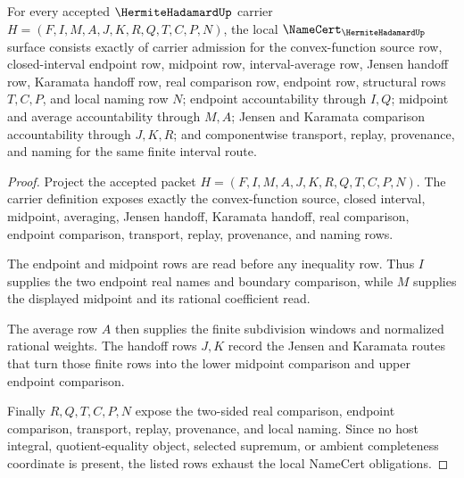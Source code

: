 \begin{theorem}
\label{thm:hermite-hadamard-namecert-obligations}
For every accepted $\HermiteHadamardUp$ carrier $H=(F,I,M,A,J,K,R,Q,T,C,P,N)$, the local $\NameCert_{\HermiteHadamardUp}$ surface consists exactly of carrier admission for the convex-function source row, closed-interval endpoint row, midpoint row, interval-average row, Jensen handoff row, Karamata handoff row, real comparison row, endpoint row, structural rows $T,C,P$, and local naming row $N$; endpoint accountability through $I,Q$; midpoint and average accountability through $M,A$; Jensen and Karamata comparison accountability through $J,K,R$; and componentwise transport, replay, provenance, and naming for the same finite interval route.
\end{theorem}
\begin{proof}
Project the accepted packet $H=(F,I,M,A,J,K,R,Q,T,C,P,N)$. The carrier definition exposes exactly the convex-function source, closed interval, midpoint, averaging, Jensen handoff, Karamata handoff, real comparison, endpoint comparison, transport, replay, provenance, and naming rows.

The endpoint and midpoint rows are read before any inequality row. Thus $I$ supplies the two endpoint real names and boundary comparison, while $M$ supplies the displayed midpoint and its rational coefficient read.

The average row $A$ then supplies the finite subdivision windows and normalized rational weights. The handoff rows $J,K$ record the Jensen and Karamata routes that turn those finite rows into the lower midpoint comparison and upper endpoint comparison.

Finally $R,Q,T,C,P,N$ expose the two-sided real comparison, endpoint comparison, transport, replay, provenance, and local naming. Since no host integral, quotient-equality object, selected supremum, or ambient completeness coordinate is present, the listed rows exhaust the local NameCert obligations.
\end{proof}

